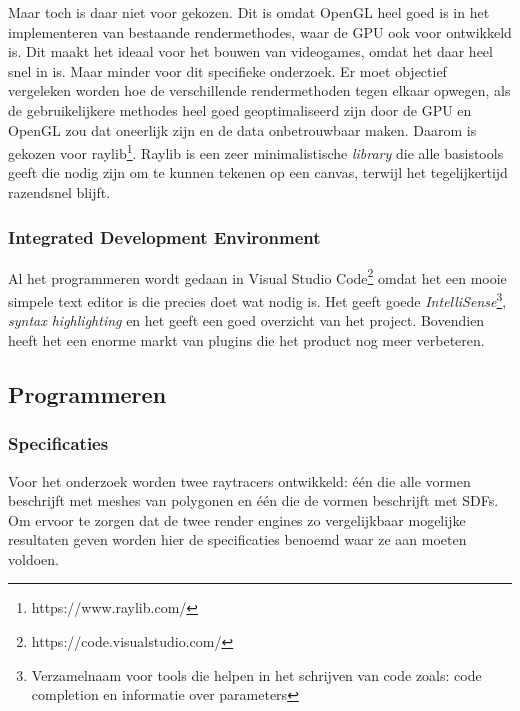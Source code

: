\documentclass[12pt, a4paper]{article}
\begin{document}
Maar toch is daar niet voor gekozen. Dit is omdat OpenGL heel goed is in het implementeren van bestaande rendermethodes, waar de GPU ook voor ontwikkeld is. Dit maakt het ideaal voor het bouwen van videogames, omdat het daar heel snel in is. Maar minder voor dit specifieke onderzoek. Er moet objectief vergeleken worden hoe de verschillende rendermethoden tegen elkaar opwegen, als de gebruikelijkere methodes heel goed geoptimaliseerd zijn door de GPU en OpenGL zou dat oneerlijk zijn en de data onbetrouwbaar maken. Daarom is gekozen voor raylib\footnote{https://www.raylib.com/}. Raylib is een zeer minimalistische \emph{library} die alle basistools geeft die nodig zijn om te kunnen tekenen op een canvas, terwijl het tegelijkertijd razendsnel blijft. 
\subsubsection{Integrated Development Environment}
Al het programmeren wordt gedaan in Visual Studio Code\footnote{https://code.visualstudio.com/} omdat het een mooie simpele text editor is die precies doet wat nodig is. Het geeft goede \textit{IntelliSense}\footnote{Verzamelnaam voor tools die helpen in het schrijven van code zoals: code completion en informatie over parameters}, \textit{syntax highlighting} en het geeft een goed overzicht van het project. Bovendien heeft het een enorme markt van plugins die het product nog meer verbeteren.
\subsection{Programmeren}
\subsubsection{Specificaties}
Voor het onderzoek worden twee raytracers ontwikkeld: één die alle vormen beschrijft met meshes van polygonen en één die de vormen beschrijft met SDFs. Om ervoor te zorgen dat de twee render engines zo vergelijkbaar mogelijke resultaten geven worden hier de specificaties benoemd waar ze aan moeten voldoen.
\end{document}
